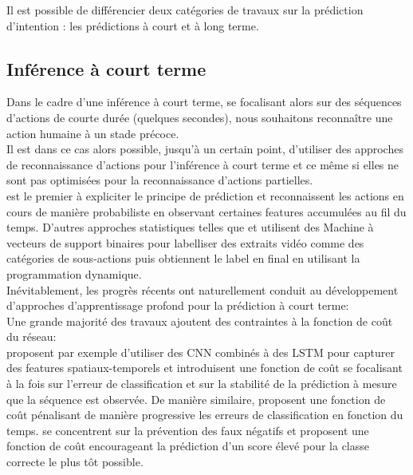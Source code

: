 Il est possible de différencier deux catégories de travaux sur la prédiction d’intention : les prédictions à court  et à long terme.

\subsection{Inférence à court terme}
Dans le cadre d'une inférence à court terme, se focalisant alors sur des séquences d'actions de courte durée (quelques secondes), nous souhaitons reconnaître une action humaine à un stade précoce.\\

Il est dans ce cas alors possible, jusqu'à un certain point, d'utiliser des approches de reconnaissance d'actions pour l'inférence à court terme et ce même si elles ne sont pas optimisées pour la reconnaissance d'actions partielles.\\

\cite{ryoo2011human} est le premier à expliciter le principe de prédiction et reconnaissent les actions en cours de manière probabiliste en observant certaines features accumulées au fil du temps. D'autres approches statistiques telles que \cite{soomro2018online} et \cite{soomro2016predicting} utilisent des Machine à vecteurs de support binaires pour labelliser des extraits vidéo comme des catégories de sous-actions puis obtiennent le label en final en utilisant la programmation dynamique.\\

Inévitablement, les progrès récents ont naturellement conduit au développement d'approches d'apprentissage profond pour la prédiction à court terme:\\ 

Une grande majorité des travaux ajoutent des contraintes à la fonction de coût du réseau:\\
\cite{ma2016learning} proposent par exemple d'utiliser des CNN combinés à des LSTM pour capturer des features spatiaux-temporels et introduisent une fonction de coût se focalisant à la fois sur l'erreur de classification et sur la stabilité de la prédiction à mesure que la séquence est observée. De manière similaire, \cite{jain2016recurrent} proposent une fonction de coût pénalisant de manière progressive les erreurs de classification en fonction du temps.
\cite{2017arXiv170307023S} se concentrent sur la prévention des faux négatifs et proposent une fonction de coût encourageant la prédiction d'un score élevé pour la classe correcte le plus tôt possible.\\



